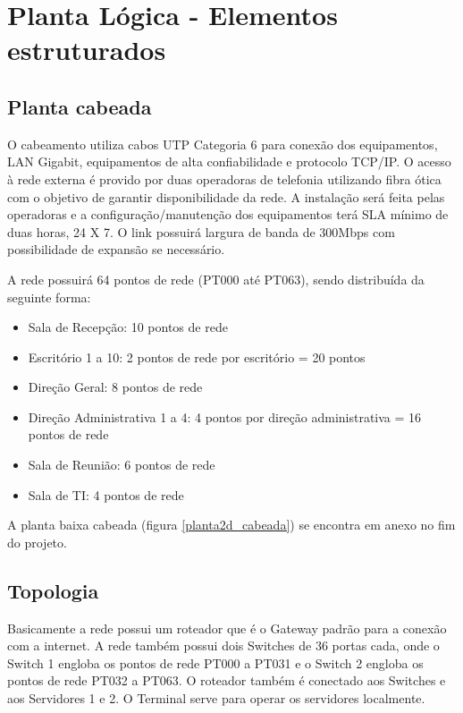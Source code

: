 \documentclass[	DIV=calc,%
							paper=a4,%
							fontsize=12pt,%
							onecolumn]{scrartcl}	 					%
\begin{document}
\section{Planta Lógica - Elementos estruturados}

\subsection{Planta cabeada}

O cabeamento utiliza cabos UTP Categoria 6 para conexão dos equipamentos, LAN Gigabit, equipamentos de alta confiabilidade e protocolo TCP/IP. O acesso à rede externa é provido por duas operadoras de telefonia utilizando fibra ótica com o objetivo de garantir disponibilidade da rede. A instalação será feita pelas operadoras e a configuração/manutenção dos equipamentos terá SLA mínimo de duas horas, 24 X 7. O link possuirá largura de banda de 300Mbps com possibilidade de expansão se necessário. 

A rede possuirá 64 pontos de rede (PT000 até PT063), sendo distribuída da seguinte forma:

\begin{itemize}
\item Sala de Recepção: 10 pontos de rede
\item Escritório 1 a 10: 2 pontos de rede por escritório = 20 pontos
\item Direção Geral: 8 pontos de rede
\item Direção Administrativa 1 a 4: 4 pontos por direção administrativa = 16 pontos de rede
\item Sala de Reunião: 6 pontos de rede
\item Sala de TI: 4 pontos de rede
\end{itemize}

A planta baixa cabeada (figura \ref{planta2d_cabeada}) se encontra em anexo no fim do projeto. 

\subsection{Topologia}

Basicamente a rede possui um roteador que é o Gateway padrão para a conexão com a internet. A rede também possui dois Switches de 36 portas cada, onde o Switch 1 engloba os pontos de rede PT000 a PT031 e o Switch 2 engloba os pontos de rede PT032 a PT063. O roteador também é conectado aos Switches e aos Servidores 1 e 2. O Terminal serve para operar os servidores localmente. 
\end{document}
